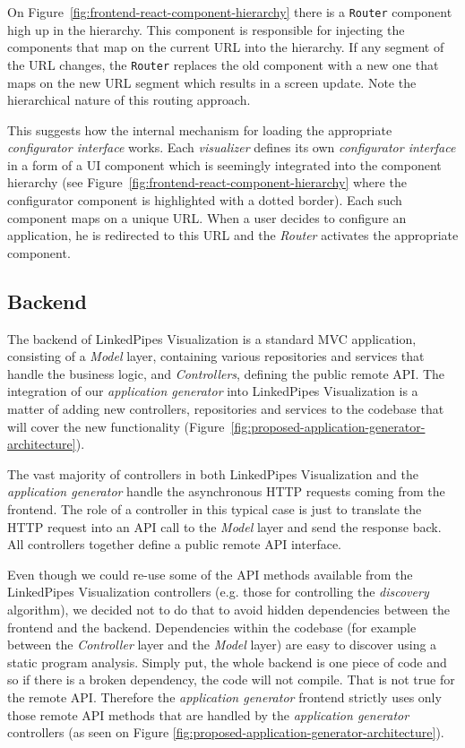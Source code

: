 On Figure~\ref{fig:frontend-react-component-hierarchy} there is a \texttt{Router} component high up in the hierarchy. This component is responsible for injecting the components that map on the current URL into the hierarchy. If any segment of the URL changes, the \texttt{Router} replaces the old component with a new one that maps on the new URL segment which results in a screen update. Note the hierarchical nature of this routing approach. 

This suggests how the internal mechanism for loading the appropriate \emph{configurator interface} works. Each \emph{visualizer} defines its own \emph{configurator interface} in a form of a UI component which is seemingly integrated into the component hierarchy (see Figure~\ref{fig:frontend-react-component-hierarchy} where the configurator component is highlighted with a dotted border). Each such component maps on a unique URL. When a user decides to configure an application, he is redirected to this URL and the \emph{Router} activates the appropriate component. 

\subsection{Backend}
\label{sec:system-proposal:architecture-analysis:backend}

The backend of LinkedPipes Visualization is a standard MVC application, consisting of a \emph{Model} layer, containing various repositories and services that handle the business logic, and \emph{Controllers}, defining the public remote API. The integration of our \emph{application generator} into LinkedPipes Visualization is a matter of adding new controllers, repositories and services to the codebase that will cover the new functionality (Figure~\ref{fig:proposed-application-generator-architecture}).

The vast majority of controllers in both LinkedPipes Visualization and the \emph{application generator} handle the asynchronous HTTP requests coming from the frontend. The role of a controller in this typical case is just to translate the HTTP request into an API call to the \emph{Model} layer and send the response back. All controllers together define a public remote API interface.

Even though we could re-use some of the API methods available from the LinkedPipes Visualization controllers (e.g. those for controlling the \emph{discovery} algorithm), we decided not to do that to avoid hidden dependencies between the frontend and the backend. Dependencies within the  codebase (for example between the \emph{Controller} layer and the \emph{Model} layer) are easy to discover using a static program analysis. Simply put, the whole backend is one piece of code and so if there is a broken dependency, the code will not compile. That is not true for the remote API. Therefore the \emph{application generator} frontend strictly uses only those remote API methods that are handled by the \emph{application generator} controllers (as seen on Figure \ref{fig:proposed-application-generator-architecture}). 

